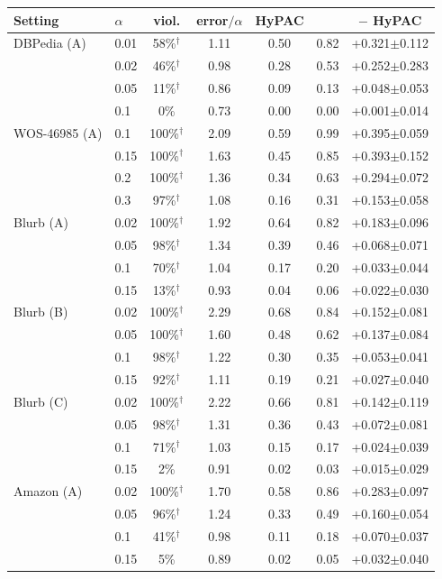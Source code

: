 \begin{tabular}{llccccc}
\toprule
Setting & $\alpha$ & viol. & error$/\alpha$ & HyPAC & \hlcl{} & \hlcl{} $-$ HyPAC \\
\midrule
DBPedia (A) & 0.01 & 58\%$^\dagger$ & 1.11 & 0.50 & 0.82 & +0.321$\pm$0.112 \\
 & 0.02 & 46\%$^\dagger$ & 0.98 & 0.28 & 0.53 & +0.252$\pm$0.283 \\
 & 0.05 & 11\%$^\dagger$ & 0.86 & 0.09 & 0.13 & +0.048$\pm$0.053 \\
 & 0.1 & 0\% & 0.73 & 0.00 & 0.00 & +0.001$\pm$0.014 \\
\addlinespace
WOS-46985 (A) & 0.1 & 100\%$^\dagger$ & 2.09 & 0.59 & 0.99 & +0.395$\pm$0.059 \\
 & 0.15 & 100\%$^\dagger$ & 1.63 & 0.45 & 0.85 & +0.393$\pm$0.152 \\
 & 0.2 & 100\%$^\dagger$ & 1.36 & 0.34 & 0.63 & +0.294$\pm$0.072 \\
 & 0.3 & 97\%$^\dagger$ & 1.08 & 0.16 & 0.31 & +0.153$\pm$0.058 \\
\addlinespace
Blurb (A) & 0.02 & 100\%$^\dagger$ & 1.92 & 0.64 & 0.82 & +0.183$\pm$0.096 \\
 & 0.05 & 98\%$^\dagger$ & 1.34 & 0.39 & 0.46 & +0.068$\pm$0.071 \\
 & 0.1 & 70\%$^\dagger$ & 1.04 & 0.17 & 0.20 & +0.033$\pm$0.044 \\
 & 0.15 & 13\%$^\dagger$ & 0.93 & 0.04 & 0.06 & +0.022$\pm$0.030 \\
\addlinespace
Blurb (B) & 0.02 & 100\%$^\dagger$ & 2.29 & 0.68 & 0.84 & +0.152$\pm$0.081 \\
 & 0.05 & 100\%$^\dagger$ & 1.60 & 0.48 & 0.62 & +0.137$\pm$0.084 \\
 & 0.1 & 98\%$^\dagger$ & 1.22 & 0.30 & 0.35 & +0.053$\pm$0.041 \\
 & 0.15 & 92\%$^\dagger$ & 1.11 & 0.19 & 0.21 & +0.027$\pm$0.040 \\
\addlinespace
Blurb (C) & 0.02 & 100\%$^\dagger$ & 2.22 & 0.66 & 0.81 & +0.142$\pm$0.119 \\
 & 0.05 & 98\%$^\dagger$ & 1.31 & 0.36 & 0.43 & +0.072$\pm$0.081 \\
 & 0.1 & 71\%$^\dagger$ & 1.03 & 0.15 & 0.17 & +0.024$\pm$0.039 \\
 & 0.15 & 2\% & 0.91 & 0.02 & 0.03 & +0.015$\pm$0.029 \\
\addlinespace
Amazon (A) & 0.02 & 100\%$^\dagger$ & 1.70 & 0.58 & 0.86 & +0.283$\pm$0.097 \\
 & 0.05 & 96\%$^\dagger$ & 1.24 & 0.33 & 0.49 & +0.160$\pm$0.054 \\
 & 0.1 & 41\%$^\dagger$ & 0.98 & 0.11 & 0.18 & +0.070$\pm$0.037 \\
 & 0.15 & 5\% & 0.89 & 0.02 & 0.05 & +0.032$\pm$0.040 \\
\bottomrule
\end{tabular}
